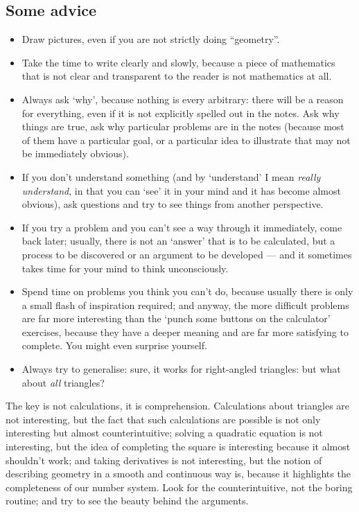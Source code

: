 \subsection*{Some advice}
\begin{itemize}
  \item Draw pictures, even if you are not strictly doing ``geometry''.
  \item Take the time to write clearly and slowly, because a piece of mathematics that is not clear and transparent to the
        reader is not mathematics at all.
  \item Always ask `why', because nothing is every arbitrary: there will be a reason for everything, even if it is not
        explicitly spelled out in the notes. Ask why things are true, ask why particular problems are in the notes (because
        most of them have a particular goal, or a particular idea to illustrate that may not be immediately obvious).
  \item If you don't understand something (and by `understand' I mean \emph{really understand}, in that you can `see' it
        in your mind and it has become almost obvious), ask questions and try to see things from another perspective.
  \item If you try a problem and you can't see a way through it immediately, come back later; usually, there is not an `answer'
        that is to be calculated, but a process to be discovered or an argument to be developed --- and it sometimes takes time
        for your mind to think unconsciously.
  \item Spend time on problems you think you can't do, because usually there is only a small flash of inspiration required;
        and anyway, the more difficult problems are far more interesting than the `punch some buttons on the calculator' exercises,
        because they have a deeper meaning and are far more satisfying to complete. You might even surprise yourself.
  \item Always try to generalise: sure, it works for right-angled triangles: but what about \emph{all} triangles?
\end{itemize}

The key is not calculations, it is comprehension. Calculations about triangles are not interesting, but the fact that such calculations
are possible is not only interesting but almost counterintuitive; solving a quadratic equation is not interesting, but the idea of
completing the square is interesting because it almost shouldn't work; and taking derivatives is not interesting, but the notion
of describing geometry in a smooth and continuous way is, because it highlights the completeness of our number system. Look for the
counterintuitive, not the boring routine; and try to see the beauty behind the arguments.

